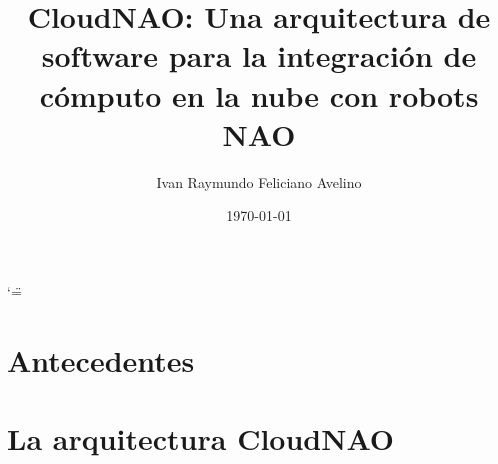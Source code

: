 \documentclass[letterpaper,12pt,spanish]{report}
\title{CloudNAO: Una arquitectura de software para la integración de
cómputo en la nube con robots NAO}
\date{\today}
\author{Ivan Raymundo Feliciano Avelino}
\begin{document}
\ifnum\catcode`\"=\active{}\fi
\maketitle
\sphinxtableofcontents








\chapter{Antecedentes}
\label{\detokenize{chapter_one:antecedentes}}\label{\detokenize{chapter_one::doc}}









\chapter{La arquitectura CloudNAO}
\label{\detokenize{chapter_two:la-arquitectura-cloudnao}}\label{\detokenize{chapter_two::doc}}









\end{document}
